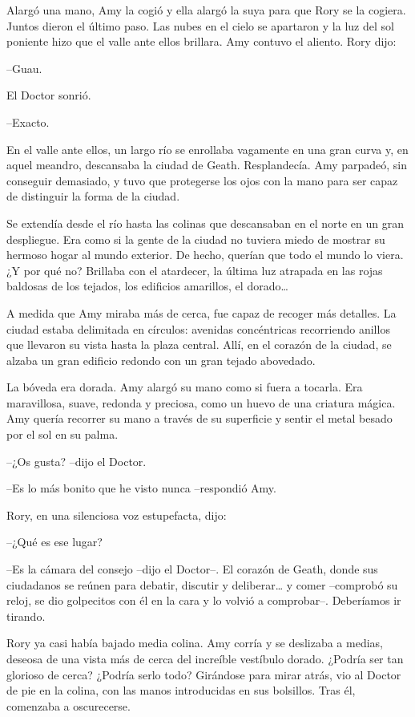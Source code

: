 {Alargó una mano, Amy la cogió y ella alargó la suya para que Rory se la
	cogiera. Juntos dieron el último paso. Las nubes en el cielo se
	apartaron y la luz del sol poniente hizo que el valle ante ellos
brillara. Amy contuvo el aliento. Rory dijo:}

{--Guau.}

{El Doctor sonrió.}

{--Exacto.}

{En el valle ante ellos, un largo río se enrollaba vagamente en una gran
	curva y, en aquel meandro, descansaba la ciudad de Geath. Resplandecía.
	Amy parpadeó, sin conseguir demasiado, y tuvo que protegerse los ojos
con la mano para ser capaz de distinguir la forma de la ciudad.}

{Se extendía desde el río hasta las colinas que descansaban en el norte
	en un gran despliegue. Era como si la gente de la ciudad no tuviera
	miedo de mostrar su hermoso hogar al mundo exterior. De hecho, querían
	que todo el mundo lo viera. ¿Y por qué no? Brillaba con el atardecer, la
	última luz atrapada en las rojas baldosas de los tejados, los edificios
	amarillos, el dorado\ldots{}}

{A medida que Amy miraba más de cerca, fue capaz de recoger más
	detalles. La ciudad estaba delimitada en círculos: avenidas concéntricas
	recorriendo anillos que llevaron su vista hasta la plaza central. Allí,
	en el corazón de la ciudad, se alzaba un gran edificio redondo con un
gran tejado abovedado.}

{La bóveda era dorada. Amy alargó su mano como si fuera a tocarla. Era
	maravillosa, suave, redonda y preciosa, como un huevo de una criatura
	mágica. Amy quería recorrer su mano a través de su superficie y sentir
el metal besado por el sol en su palma.}

{--¿Os gusta? --dijo el Doctor.}

{--Es lo más bonito que he visto nunca --respondió Amy.}

{Rory, en una silenciosa voz estupefacta, dijo:}

{--¿Qué es ese lugar?}

{--Es la cámara del consejo --dijo el Doctor--. El corazón de Geath,
	donde sus ciudadanos se reúnen para debatir, discutir y
	deliberar\ldots{} y comer --comprobó su reloj, se dio golpecitos con él
en la cara y lo volvió a comprobar--. Deberíamos ir tirando.}

{Rory ya casi había bajado media colina. Amy corría y se deslizaba a
	medias, deseosa de una vista más de cerca del increíble vestíbulo
	dorado. ¿Podría ser tan glorioso de cerca? ¿Podría serlo todo? Girándose
	para mirar atrás, vio al Doctor de pie en la colina, con las manos
introducidas en sus bolsillos. Tras él, comenzaba a oscurecerse.}


